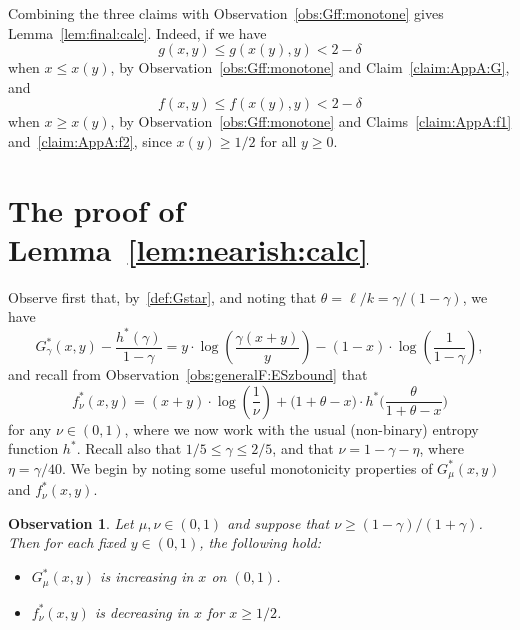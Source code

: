 \documentclass[12pt,reqno]{amsart}
\newtheorem{obs}[theorem]{Observation}
\theoremstyle{definition}
\theoremstyle{remark}
\renewcommand{\le}{\leqslant}
\renewcommand{\ge}{\geqslant}
\begin{document}
Combining the three claims with Observation~\ref{obs:Gff:monotone} gives Lemma~\ref{lem:final:calc}. Indeed, if we have 
$$g(x,y) \le g(x(y),y) < 2 - \delta$$ 
when $x \le x(y)$, by Observation~\ref{obs:Gff:monotone} and Claim~\ref{claim:AppA:G}, and 
$$f(x,y) \le f(x(y),y) < 2 - \delta$$ 
when $x \ge x(y)$, by Observation~\ref{obs:Gff:monotone} and Claims~\ref{claim:AppA:f1} and~\ref{claim:AppA:f2}, since $x(y) \ge 1/2$ for all $y \ge 0$. 


\section{The proof of Lemma~\ref{lem:nearish:calc}}\label{app:off:calc:gamma}

Observe first that, by~\eqref{def:Gstar}, and noting that $\theta = \ell/k = \gamma/(1-\gamma)$, we have
$$G_\gamma^*(x,y) - \frac{h^*(\gamma)}{1-\gamma} = y \cdot \log \left( \frac{\gamma(x+y)}{y} \right) - (1 - x) \cdot \log \left(\frac{1}{1-\gamma} \right),$$
and recall from Observation~\ref{obs:generalF:ESzbound} that
$$f_\nu^*(x,y) = (x + y) \cdot \log \left(\frac{1}{\nu}\right) + \big( 1 + \theta - x \big) \cdot h^*\bigg( \frac{\theta}{1 + \theta - x} \bigg)$$
for any $\nu \in (0,1)$, where we now work with the usual (non-binary) entropy function $h^*$. Recall also that $1/5 \le \gamma \le 2/5$, and that $\nu = 1 - \gamma - \eta$, where $\eta = \gamma/40$. 
We begin by noting some useful monotonicity properties of $G_\mu^*(x,y)$ and $f_\nu^*(x,y)$.


\begin{obs}\label{obs:Gfstar:monotone}
Let $\mu,\nu \in (0,1)$ and suppose that\/ $\nu \ge (1-\gamma)/(1+\gamma)$. Then for each fixed $y \in (0,1)$, the following hold:
\begin{itemize}
\item[$(a)$] $G_\mu^*(x,y)$ is increasing in $x$ on $(0,1)$.\smallskip
\item[$(b)$] $f_\nu^*(x,y)$ is decreasing in $x$ for $x \ge 1/2$.
\end{itemize}
\end{obs}
\end{document}

